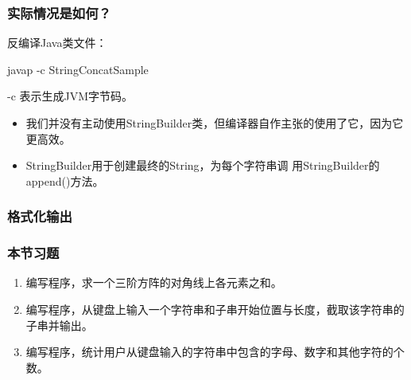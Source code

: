 \begin{frame}[fragile]
  \frametitle{实际情况是如何？}


  反编译Java类文件：
  
  \begin{shCode}
    javap -c StringConcatSample
  \end{shCode}

  {\kai -c 表示生成JVM字节码。}

  \pause

  \begin{itemize}
  \item 我们并没有主动使用StringBuilder类，但编译器自作主张的使用了它，因为它{\hei\Red 更高效}。
  \item StringBuilder用于创建最终的String，为每个字符串调
    用StringBuilder的append()方法。
\end{itemize}
  
\end{frame}

\begin{frame}[fragile]
  \frametitle{格式化输出}


  
  
  
  
\end{frame}


\begin{frame}
  \frametitle{本节习题}

  \begin{enumerate}
  \item 编写程序，求一个三阶方阵的对角线上各元素之和。
  \item 编写程序，从键盘上输入一个字符串和子串开始位置与长度，截取该字符串的子串并输出。
  \item 编写程序，统计用户从键盘输入的字符串中包含的字母、数字和其他字符的个数。
  \end{enumerate}
\end{frame}



